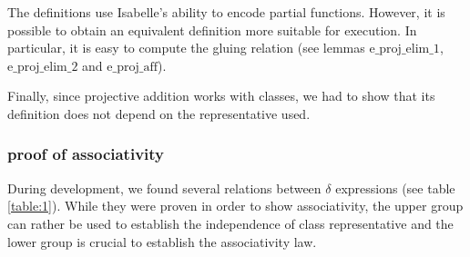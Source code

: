 \documentclass{llncs}
\begin{document}

The definitions use Isabelle's ability to encode partial
functions. However, it is possible to obtain an equivalent definition
more suitable for execution. In particular, it is easy to compute the
gluing relation (see lemmas $\text{e\_proj\_elim\_1}$,
$\text{e\_proj\_elim\_2}$ and $\text{e\_proj\_aff}$).

Finally, since projective addition works with classes, we had to show
that its definition does not depend on the representative used.


\subsubsection{proof of associativity}

During development, we found several relations between $\delta$
expressions (see table \ref{table:1}). While they were proven in order
to show associativity, the upper group can rather be used to establish
the independence of class representative and the lower group is
crucial to establish the associativity law.
\end{document}
